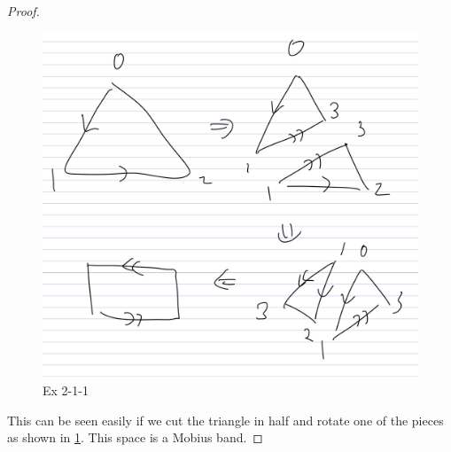 \documentclass[12pt, psamsfonts]{amsart}
\theoremstyle{definition}
\theoremstyle{remark}
\numberwithin{equation}{section}
\begin{document}
\begin{proof}
  \begin{figure}[!htb]
    \includegraphics[width=.5\linewidth]{img/hatcher/ex-2-1-1.jpeg}
    \caption{Ex 2-1-1}
    \label{fig:ex_2_1_1}
  \end{figure}

  This can be seen easily if we cut the triangle in half and rotate one of the pieces as shown in \ref{fig:ex_2_1_1}.
  This space is a Mobius band.
\end{proof}
\end{document}
